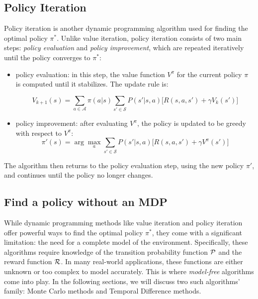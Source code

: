 \subsection{Policy Iteration}
Policy iteration is another dynamic programming algorithm used for finding the optimal policy \(\pi^*\). 
 Unlike value iteration, policy iteration consists of two main steps: 
 \emph{policy evaluation} and \emph{policy improvement}, 
 which are repeated iteratively until the policy converges to \(\pi^*\):
\begin{itemize}
  \item policy evaluation: in this step, the value function \(V^\pi\) for the current policy \(\pi\) is computed until it stabilizes. The update rule is:

  \begin{equation}
  V_{k+1}(s) = \sum_{a \in \mathcal{A}} \pi(a|s) \sum_{s' \in \mathcal{S}} P(s'|s, a) \Big[ R(s, a, s') + \gamma V_k(s') \Big]
  \end{equation}
  \item policy improvement: after evaluating \(V^\pi\), the policy is updated to be greedy with respect to \(V^\pi\):
  \begin{equation}
  \pi'(s) = \arg \max_{a} \sum_{s' \in \mathcal{S}} P(s'|s, a) \Big[ R(s, a, s') + \gamma V^\pi(s') \Big]
  \end{equation}
\end{itemize}
The algorithm then returns to the policy evaluation step, using the new policy \(\pi'\), and continues until the policy no longer changes.
 
\subsection{Find a policy without an MDP}
While dynamic programming methods like value iteration and policy iteration offer powerful ways to find the optimal policy \(\pi^*\), 
 they come with a significant limitation: 
 the need for a complete model of the environment. 
 Specifically, these algorithms require knowledge of the transition probability function \(\mathcal{P}\) and the reward function \(\mathcal{R}\). 
 In many real-world applications, these functions are either unknown or too complex to model accurately. 
 This is where \emph{model-free} algorithms come into play.
 In the following sections, we will discuss two such algorithms' family: 
 Monte Carlo methods and Temporal Difference methods.
